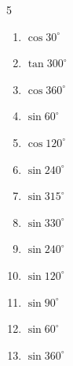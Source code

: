 \begin{multicols}{5}
\begin{enumerate}
  \item $\displaystyle \cos{30^\circ}$


  \item $\displaystyle \tan{300^\circ}$


  \item $\displaystyle \cos{360^\circ}$

        \phantom{$\displaystyle =1$}

  \item $\displaystyle \sin{60^\circ}$


  \item $\displaystyle \cos{120^\circ}$


  \item $\displaystyle \sin{240^\circ}$


  \item $\displaystyle \sin{315^\circ}$


  \item $\displaystyle \sin{330^\circ}$


\columnbreak %

  \item $\displaystyle \sin{240^\circ}$


  \item $\displaystyle \sin{120^\circ}$


  \item $\displaystyle \sin{90^\circ}$

        \phantom{$\displaystyle =1$}

  \item $\displaystyle \sin{60^\circ}$


  \item $\displaystyle \sin{360^\circ}$


\end{enumerate}
\end{multicols}
